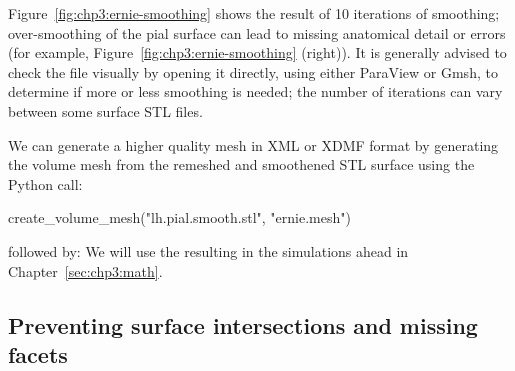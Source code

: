 %

Figure~\ref{fig:chp3:ernie-smoothing} shows the result of 10
iterations of smoothing; over-smoothing of the pial surface can lead
to missing anatomical detail or errors (for example,
Figure~\ref{fig:chp3:ernie-smoothing} (right)). It is generally
advised to check the file visually by opening it directly, using
either ParaView or Gmsh, to determine if more or less smoothing is
needed; the number of iterations can vary between some surface STL
files.

We can generate a higher quality mesh in XML or XDMF format by
generating the volume mesh from the remeshed and smoothened STL
surface using the Python call:
\begin{python}
create_volume_mesh("lh.pial.smooth.stl", "ernie.mesh")
\end{python}
followed by:
\noindent We will use the resulting  in the
simulations ahead in Chapter~\ref{sec:chp3:math}.

\subsection{Preventing surface intersections and missing facets}
\label{subsec:chp3:preventing-surface-intersections}

